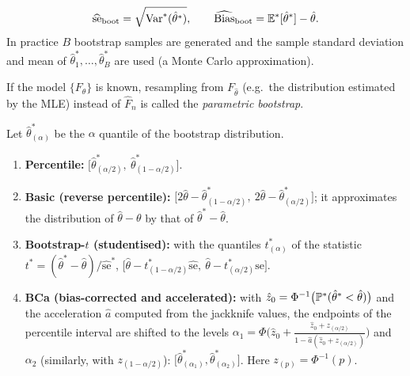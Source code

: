 \documentclass[main.tex]{subfiles}
\begin{document}
\begin{definition}
\[
\widehat{\mathrm{se}}_{\text{boot}}=\sqrt{\Var^*(\hat\theta^*)},\qquad\widehat{\Bias}_{\text{boot}}=\E^*[\hat\theta^*]-\hat\theta .
\]
In practice $B$ bootstrap samples are generated and the sample standard deviation and mean of $\hat\theta^*_1,\dots,\hat\theta^*_B$ are used (a Monte Carlo approximation).
\end{definition}

\begin{definition}
If the model $\{F_\theta\}$ is known, resampling from $F_{\hat\theta}$ (e.g.\ the distribution estimated by the MLE) instead of $\hat F_n$ is called the \emph{parametric bootstrap}.
\end{definition}

\begin{definition}\label{def:boot-ci}
Let $\hat\theta^*_{(\alpha)}$ be the $\alpha$ quantile of the bootstrap distribution.
\begin{enumerate}
  \item \textbf{Percentile:} $\big[\hat\theta^*_{(\alpha/2)},\ \hat\theta^*_{(1-\alpha/2)}\big]$.
  \item \textbf{Basic (reverse percentile):} $\big[2\hat\theta-\hat\theta^*_{(1-\alpha/2)},\ 2\hat\theta-\hat\theta^*_{(\alpha/2)}\big]$; it approximates the distribution of $\hat\theta-\theta$ by that of $\hat\theta^*-\hat\theta$.
  \item \textbf{Bootstrap-$t$ (studentised):} with the quantiles $t^*_{(\alpha)}$ of the statistic $t^*=(\hat\theta^*-\hat\theta)/\widehat{\mathrm{se}}^*$, $\big[\hat\theta-t^*_{(1-\alpha/2)}\widehat{\mathrm{se}},\ \hat\theta-t^*_{(\alpha/2)}\widehat{\mathrm{se}}\big]$.
  \item \textbf{BCa (bias-corrected and accelerated):} with $\hat z_0=\Phi^{-1}\big(\P^*(\hat\theta^*<\hat\theta)\big)$ and the acceleration $\hat a$ computed from the jackknife values, the endpoints of the percentile interval are shifted to the levels $\alpha_1=\Phi\Big(\hat z_0+\frac{\hat z_0+z_{(\alpha/2)}}{1-\hat a(\hat z_0+z_{(\alpha/2)})}\Big)$ and $\alpha_2$ (similarly, with $z_{(1-\alpha/2)}$): $\big[\hat\theta^*_{(\alpha_1)},\hat\theta^*_{(\alpha_2)}\big]$. Here $z_{(p)}=\Phi^{-1}(p)$.
\end{enumerate}
\end{definition}
\end{document}
